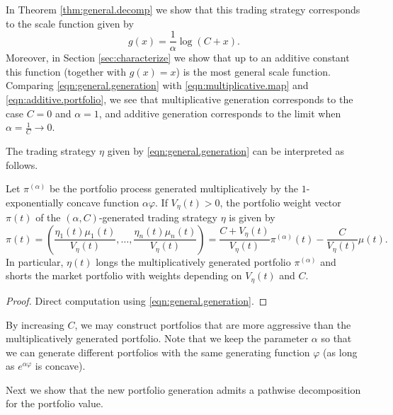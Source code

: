 \documentclass[graybox]{svmult}
\begin{document}
In Theorem \ref{thm:general.decomp} we show that this trading strategy corresponds to the scale function given by\begin{equation} \label{eqn:general.scale.function}
g(x) = \frac{1}{\alpha} \log (C + x).
\end{equation}
Moreover, in Section \ref{sec:characterize} we show that up to an additive constant this function (together with $g(x) = x$) is the most general scale function. Comparing \eqref{eqn:general.generation} with \eqref{eqn:multiplicative.map} and \eqref{eqn:additive.portfolio}, we see that multiplicative generation corresponds to the case $C = 0$ and $\alpha = 1$, and additive generation corresponds to the limit when $\alpha = \frac{1}{C} \rightarrow 0$. 

The trading strategy $\eta$ given by \eqref{eqn:general.generation} can be interpreted as follows. 

\begin{lemma} 
Let $\pi^{(\alpha)}$ be the portfolio process generated multiplicatively by the $1$-exponentially concave function $\alpha \varphi$. If $V_{\eta}(t) > 0$, the portfolio weight vector $\pi(t)$ of the $(\alpha, C)$-generated trading strategy $\eta$ is given by
\begin{equation} \label{eqn:eta.weight}
\pi(t) = \left( \frac{\eta_1(t) \mu_1(t)}{V_{\eta}(t)}, \ldots, \frac{\eta_n(t) \mu_n(t)}{V_{\eta}(t)}\right) = \frac{C + V_{\eta}(t)}{V_{\eta}(t)} \pi^{(\alpha)}(t) - \frac{C}{V_{\eta}(t)} \mu(t).
\end{equation}
In particular, $\eta(t)$ longs the multiplicatively generated portfolio $\pi^{(\alpha)}$ and shorts the market portfolio with weights depending on $V_{\eta}(t)$ and $C$.
\end{lemma}
\begin{proof}
Direct computation using \eqref{eqn:general.generation}.
\end{proof}

By increasing $C$, we may construct portfolios that are more aggressive than the multiplicatively generated portfolio. Note that we keep the parameter $\alpha$ so that we can generate different portfolios with the same generating function $\varphi$ (as long as $e^{\alpha \varphi}$ is concave).

Next we show that the new portfolio generation admits a pathwise decomposition for the portfolio value.
\end{document}
